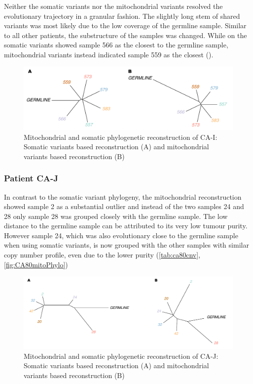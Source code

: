 Neither the somatic variants nor the mitochondrial variants resolved the evolutionary trajectory in a granular fashion. The slightly long stem of shared variants was most likely due to the low coverage of the germline sample. Similar to all other patients, the substructure of the samples was changed. While on the somatic variants showed sample 566 as the closest to the germline sample, mitochondrial variants instead indicated sample 559 as the closest ().


\begin{figure}[ht]
\centering
\includegraphics[width=.99\linewidth]{Figures/CASCADE/mito/CA51SomVsMitoPhylo.pdf}
\caption[Mitochondrial and somatic phylogenetic reconstruction of CA-I]{Mitochondrial and somatic phylogenetic reconstruction of CA-I: Somatic variants based reconstruction (A) and mitochondrial variants based reconstruction (B)} \label{fig:CA51mitoPhylo}
\end{figure}


\subsubsection{Patient CA-J}

In contrast to the somatic variant phylogeny, the mitochondrial reconstruction showed sample 2 as a substantial outlier and instead of the two samples 24 and 28 only sample 28 was grouped closely with the germline sample. The low distance to the germline sample can be attributed to its very low tumour purity. However sample 24, which was also evolutionary close to the germline sample when using somatic variants, is now grouped with the other samples with similar copy number profile, even due to the lower purity (\autoref{tab:ca80cnv}, \autoref{fig:CA80mitoPhylo})

\begin{figure}[ht]
\centering
\includegraphics[width=.99\linewidth]{Figures/CASCADE/mito/CA80SomVsMitoPhylo.pdf}
\caption[Mitochondrial and somatic phylogenetic reconstruction of CA-J]{Mitochondrial and somatic phylogenetic reconstruction of CA-J: Somatic variants based reconstruction (A) and mitochondrial variants based reconstruction (B)} \label{fig:CA80mitoPhylo}
\end{figure}


